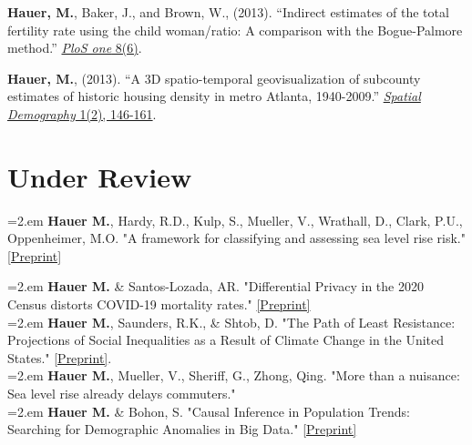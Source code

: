 \begin{etaremune}
\item \textbf{Hauer, M.}, Baker, J., and Brown, W., (2013). ``Indirect estimates of the total fertility rate using the child                        woman/ratio: A comparison with the Bogue-Palmore method.'' \href{http://journals.plos.org/plosone/article?id=10.1371/journal.pone.0067226}{\textit{PloS one} 8(6)}.\\

\item \textbf{Hauer, M.}, (2013). ``A 3D spatio-temporal geovisualization of subcounty estimates of historic housing density in metro Atlanta, 1940-2009.'' \href{http://link.springer.com/article/10.1007/BF03354895}{\textit{Spatial Demography} 1(2), 146-161}.\\

 \end{etaremune}


\section{Under Review}

\hangindent=2.em \textbf{Hauer M.}, Hardy, R.D., Kulp, S., Mueller, V., Wrathall, D., Clark, P.U., Oppenheimer, M.O. "A framework for classifying and assessing sea level rise risk." \href{https://osf.io/preprints/socarxiv/tf6rj/}{[Preprint]}

\hangindent=2.em \textbf{Hauer M.} \& Santos-Lozada, AR. "Differential Privacy in the 2020 Census distorts COVID-19 mortality rates." \href{https://osf.io/mvh5b/}{[Preprint]} \\

 \hangindent=2.em \textbf{Hauer M.}, Saunders, R.K., \& Shtob, D. "The Path of Least Resistance: Projections of Social Inequalities as a Result of Climate Change in the United States." \href{https://osf.io/preprints/socarxiv/7jtrn/}{[Preprint]}. \\

 \hangindent=2.em \textbf{Hauer M.}, Mueller, V., Sheriff, G., Zhong, Qing. "More than a nuisance: Sea level rise already delays commuters."\\

       \hangindent=2.em \textbf{Hauer M.} \& Bohon, S. "Causal Inference in Population Trends: Searching for Demographic Anomalies in Big Data." \href{https://osf.io/preprints/socarxiv/xn2v9/}{[Preprint]}  \\

